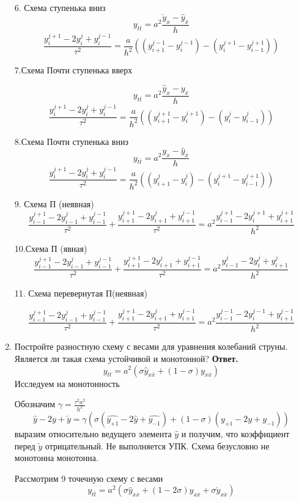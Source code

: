 \documentclass{article}
\begin{document}
\begin{enumerate}
		6. Схема ступенька вниз
		\[
		y_{t\overline{t}} = a^2 \frac{\check{y}_x - \hat{y}_{\overline{x}}}{h}
		\]
		\[
		\frac{y_{i}^{j+1}-2y_i^{j}+y_i^{j-1}}{\tau^2} = \frac{a}{h^2} ((y_{i+1}^{j-1} -y_{i}^{j-1} )-(y_i^{j+1} - y_{i-1}^{j+1}))
		\]
		
		
		7.Схема Почти ступенька вверх
		
		\[
		y_{t\overline{t}} = a^2 \frac{\hat{y}_x - {y}_{\overline{x}}}{h}
		\]
		\[
		\frac{y_{i}^{j+1}-2y_i^{j}+y_i^{j-1}}{\tau^2} = \frac{a}{h^2} ((y_{i+1}^{j+1}-y_{i}^{j+1}) -(y_i^{j}- y_{i-1}^{j}))
		\]
		
		8.Схема Почти ступенька вниз
		\[
		y_{t\overline{t}} = a^2 \frac{{y}_x - \hat{y}_{\overline{x}}}{h}
		\]
		\[
		\frac{y_{i}^{j+1}-2y_i^{j}+y_i^{j-1}}{\tau^2} = \frac{a}{h^2} ((y_{i+1}^{j} -y_{i}^{j} )-(y_i^{j+1} - y_{i-1}^{j+1}))
		\]
		
		
		9. Схема П (неявная)
		\[
		\frac{y_{i-1}^{j+1}-2y_{i-1}^{j}+y_{i-1}^{j-1}}{\tau^2} + \frac{y_{i+1}^{j+1}-2y_{i+1}^{j}+y_{i+1}^{j-1}}{\tau^2} = a^2\frac{y_{i-1}^{j+1} -2y_i^{j+1} +y_{i+1}^{j+1}}{h^2}
		\]
		
		
		10.Схема П (явная)
		\[
		\frac{y_{i-1}^{j+1}-2y_{i-1}^{j}+y_{i-1}^{j-1}}{\tau^2} + \frac{y_{i+1}^{j+1}-2y_{i+1}^{j}+y_{i+1}^{j-1}}{\tau^2} = a^2\frac{y_{i-1}^{j} -2y_i^{j} +y_{i+1}^{j}}{h^2}
		\]
		
		
		11. Схема перевернутая П(неявная)

		\[
		\frac{y_{i-1}^{j+1}-2y_{i-1}^{j}+y_{i-1}^{j-1}}{\tau^2} + \frac{y_{i+1}^{j+1}-2y_{i+1}^{j}+y_{i+1}^{j-1}}{\tau^2} = a^2\frac{y_{i-1}^{j-1} -2y_i^{j-1} +y_{i+1}^{j-1}}{h^2}
		\]
		\item Постройте разностную схему с весами для уравнения
		колебаний струны. Является ли такая схема устойчивой
		и монотонной?
		\newline 
		{\bfseries Ответ. } 
		\[
		y_{t\overline{t}} = a^2( \sigma \hat{y}_{x\overline{x}} + (1- \sigma)y_{x\overline{x}})
		\]
		Исследуем на монотонность
		
		
		Обозначим $\gamma = \frac{\tau^2a^2}{h^2}$
		\[
		\hat{y} - 2y+ \check{y} = \gamma(\sigma(\hat{y_{+1}} -2\hat{y} +\hat{y_{-1}}) + (1-\sigma)(y_{+1}-2y+y_{-1}))
		\]
		выразим относительно ведущего элемента $\hat{y}$ и получим, что коэффициент перед $\check{y}$ отрицательный. Не выполняется УПК. Схема безусловно не монотонна монотонна.
		
		
		
		Рассмотрим 9 точечную схему с весами
		\[
		y_{t\overline{t}} = a^2( \sigma \hat{y}_{x\overline{x}} + (1-2 \sigma)y_{x\overline{x}} + \sigma \check{y}_{x\overline{x}})
		\]
		

\end{enumerate}
\end{document}
